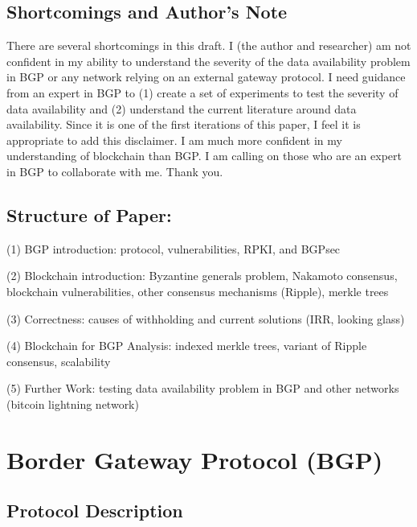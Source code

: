 \documentclass[letterpaper, 10 pt, conference]{ieeeconf}  %
\begin{document}
\subsection{Shortcomings and Author’s Note}

There are several shortcomings in this draft. I (the author and researcher) am not confident in my ability to understand the severity of the data availability problem in BGP or any network relying on an external gateway protocol. I need guidance from an expert in BGP to (1) create a set of experiments to test the severity of data availability and (2) understand the current literature around data availability. Since it is one of the first iterations of this paper, I feel it is appropriate to add this disclaimer. I am much more confident in my understanding of blockchain than BGP. I am calling on those who are an expert in BGP to collaborate with me. Thank you.  


\subsection{Structure of Paper:
}

(1) BGP introduction: protocol, vulnerabilities, RPKI, and BGPsec

(2) Blockchain introduction: Byzantine generals problem, Nakamoto consensus, blockchain vulnerabilities, other consensus mechanisms (Ripple), merkle trees

(3) Correctness: causes of withholding and current solutions (IRR, looking glass)

(4) Blockchain for BGP Analysis: indexed merkle trees, variant of Ripple consensus, scalability

(5) Further Work: testing data availability problem in BGP and other networks (bitcoin lightning network)


\section{Border Gateway Protocol (BGP)}

\subsection{Protocol Description}
\end{document}
